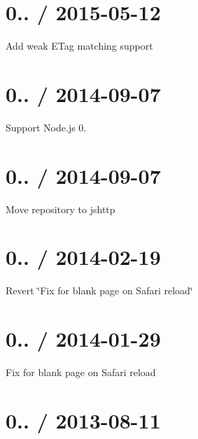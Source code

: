 \section*{0.. / 2015-\/05-\/12 }


\begin{DoxyItemize}
\item Add weak {\ttfamily E\+Tag} matching support
\end{DoxyItemize}

\section*{0.. / 2014-\/09-\/07 }


\begin{DoxyItemize}
\item Support Node.\+js 0.
\end{DoxyItemize}

\section*{0.. / 2014-\/09-\/07 }


\begin{DoxyItemize}
\item Move repository to jshttp
\end{DoxyItemize}

\section*{0.. / 2014-\/02-\/19 }


\begin{DoxyItemize}
\item Revert \char`\"{}\+Fix for blank page on Safari reload\char`\"{}
\end{DoxyItemize}

\section*{0.. / 2014-\/01-\/29 }


\begin{DoxyItemize}
\item Fix for blank page on Safari reload
\end{DoxyItemize}

\section*{0.. / 2013-\/08-\/11 }


